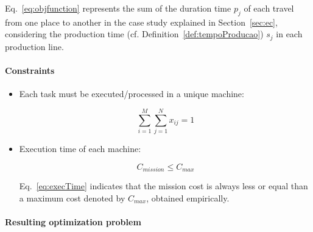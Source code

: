 \documentclass[conference,harvard,brazil,english]{sbatex}
\begin{document}
Eq.~\eqref{eq:objfunction} represents the sum of the duration time $p_j$ of each travel from one place to another in the case study explained in Section~\ref{sec:ec}, considering the production time (cf. Definition~\ref{def:tempoProducao}) $s_j$ in each production line.



\paragraph{Constraints}

\begin{itemize}
\item Each task must be executed/processed in a unique machine:

\begin{equation}
\label{eq:unicity}
\sum_{i=1}^{M}{\sum_{j=1}^{N}{x_{ij}}}=1
\end{equation}

\item Execution time of each machine:

\begin{equation}
\label{eq:execTime}
C_{mission}\leq C_{max}
\end{equation}

Eq.~\eqref{eq:execTime} indicates that the mission cost is always less or equal than a maximum cost denoted by $C_{max}$, obtained empirically.
\end{itemize}


\paragraph{Resulting optimization problem}
\end{document}

